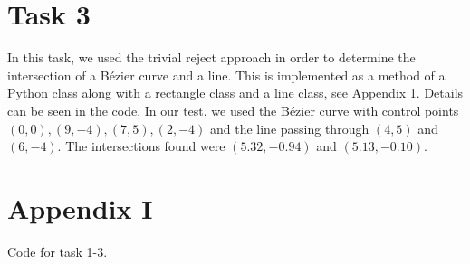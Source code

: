 \documentclass[]{article}
\begin{document}
\section*{Task 3}
In this task, we used the trivial reject approach in order to determine the intersection of a Bézier curve and a line. This is implemented as a method of a Python class along with a rectangle class and a line class, see Appendix 1. Details can be seen in the code. In our test, we used the Bézier curve with control points $(0, 0), (9, -4), (7, 5), (2, -4)$ and the line passing through $(4, 5)$ and $(6, -4)$. The intersections found were $(5.32, -0.94)$ and $(5.13, -0.10)$.

\newpage
\section*{Appendix I}
Code for task 1-3.

\end{document}
